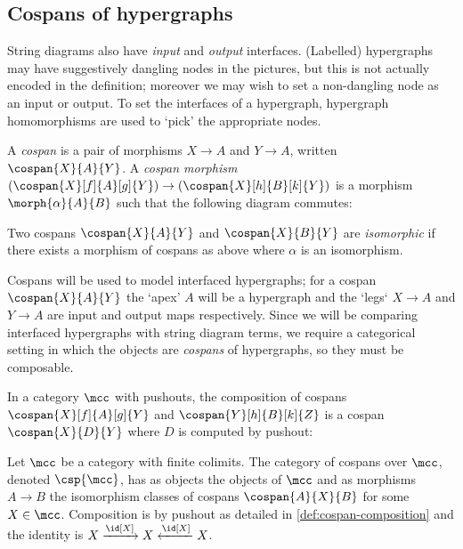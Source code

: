 \subsection{Cospans of hypergraphs}

String diagrams also have \emph{input} and \emph{output} interfaces.
(Labelled) hypergraphs may have suggestively dangling nodes in the pictures,
but this is not actually encoded in the definition; moreover we may wish to
set a non-dangling node as an input or output.
To set the interfaces of a hypergraph, hypergraph homomorphisms are used
to `pick' the appropriate nodes.

\begin{definition}[Cospan]
    A \emph{cospan} is a pair of morphisms \(X \to A\)
    and \(Y \to A\), written \(\cospan{X}{A}{Y}\).
    A \emph{cospan morphism} \(
    (\cospan{X}[f]{A}[g]{Y}) \to (\cospan{X}[h]{B}[k]{Y})
    \) is a morphism \(\morph{\alpha}{A}{B}\) such that the following diagram
    commutes:
    \begin{center}
        
    \end{center}
    Two cospans \(\cospan{X}{A}{Y}\) and \(\cospan{X}{B}{Y}\) are
    \emph{isomorphic} if there exists a morphism of cospans as above where
    \(\alpha\) is an isomorphism.
\end{definition}

Cospans will be used to model interfaced hypergraphs; for a cospan
\(\cospan{X}{A}{Y}\) the `apex' \(A\) will be a hypergraph and the `legs`
\(X \to A\) and \(Y \to A\) are input and output maps respectively.
Since we will be comparing interfaced hypergraphs with string diagram terms,
we require a categorical setting in which the objects are
\emph{cospans} of hypergraphs, so they must be composable.

\begin{definition}
    \label{def:cospan-composition}
    In a category \(\mcc\) with pushouts, the composition of cospans
    \(\cospan{X}[f]{A}[g]{Y}\) and \(\cospan{Y}[h]{B}[k]{Z}\) is a cospan
    \(\cospan{X}{D}{Y}\) where \(D\) is computed by pushout:
    \begin{center}
        
    \end{center}
\end{definition}

\begin{definition}
    Let \(\mcc\) be a category with finite colimits.
    The category of cospans over \(\mcc\), denoted \(\csp{\mcc}\),
    has as objects the objects of \(\mcc\) and as morphisms \(A \to B\)
    the isomorphism classes of cospans \(\cospan{A}{X}{B}\) for some
    \(X \in \mcc\).
    Composition is by pushout as detailed in \cref{def:cospan-composition} and
    the identity is \(X \xrightarrow{\id[X]} X \xleftarrow{\id[X]} X\).
\end{definition}


